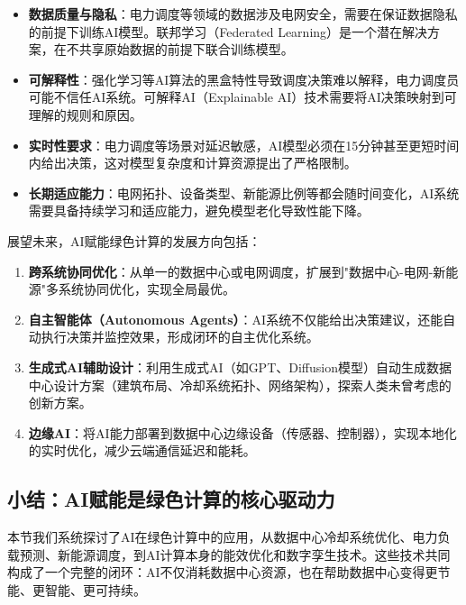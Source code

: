 \begin{itemize}
    \item \textbf{数据质量与隐私}：电力调度等领域的数据涉及电网安全，需要在保证数据隐私的前提下训练AI模型。联邦学习（Federated Learning）是一个潜在解决方案，在不共享原始数据的前提下联合训练模型。

    \item \textbf{可解释性}：强化学习等AI算法的黑盒特性导致调度决策难以解释，电力调度员可能不信任AI系统。可解释AI（Explainable AI）技术需要将AI决策映射到可理解的规则和原因。

    \item \textbf{实时性要求}：电力调度等场景对延迟敏感，AI模型必须在15分钟甚至更短时间内给出决策，这对模型复杂度和计算资源提出了严格限制。

    \item \textbf{长期适应能力}：电网拓扑、设备类型、新能源比例等都会随时间变化，AI系统需要具备持续学习和适应能力，避免模型老化导致性能下降。
\end{itemize}

展望未来，AI赋能绿色计算的发展方向包括：

\begin{enumerate}
    \item \textbf{跨系统协同优化}：从单一的数据中心或电网调度，扩展到"数据中心-电网-新能源"多系统协同优化，实现全局最优。

    \item \textbf{自主智能体（Autonomous Agents）}：AI系统不仅能给出决策建议，还能自动执行决策并监控效果，形成闭环的自主优化系统。

    \item \textbf{生成式AI辅助设计}：利用生成式AI（如GPT、Diffusion模型）自动生成数据中心设计方案（建筑布局、冷却系统拓扑、网络架构），探索人类未曾考虑的创新方案。

    \item \textbf{边缘AI}：将AI能力部署到数据中心边缘设备（传感器、控制器），实现本地化的实时优化，减少云端通信延迟和能耗。
\end{enumerate}

\subsection{小结：AI赋能是绿色计算的核心驱动力}

本节我们系统探讨了AI在绿色计算中的应用，从数据中心冷却系统优化、电力负载预测、新能源调度，到AI计算本身的能效优化和数字孪生技术。这些技术共同构成了一个完整的闭环：AI不仅消耗数据中心资源，也在帮助数据中心变得更节能、更智能、更可持续。

